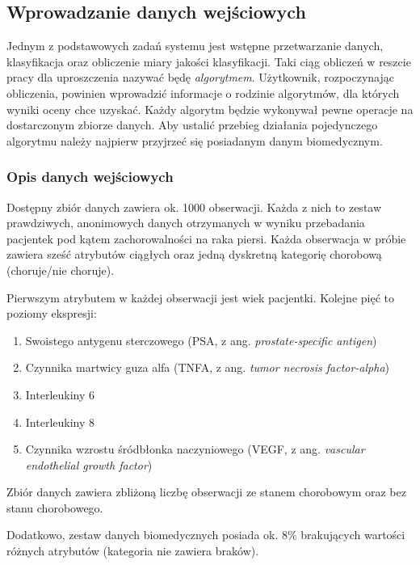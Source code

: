 \documentclass[../thesis.tex]{subfiles}
\begin{document}
\subsection{Wprowadzanie danych wejściowych}
\label{req:input}

Jednym z podstawowych zadań systemu jest wstępne przetwarzanie danych, klasyfikacja oraz obliczenie miary jakości klasyfikacji. Taki ciąg obliczeń w reszcie pracy dla uproszczenia nazywać będę \emph{algorytmem}. Użytkownik, rozpoczynając obliczenia, powinien wprowadzić informacje o rodzinie algorytmów, dla których wyniki oceny chce uzyskać. Każdy algorytm będzie wykonywał pewne operacje na dostarczonym zbiorze danych. Aby ustalić przebieg działania pojedynczego algorytmu należy najpierw przyjrzeć się posiadanym danym biomedycznym.

\subsubsection{Opis danych wejściowych}

Dostępny zbiór danych zawiera ok. 1000 obserwacji. Każda z nich to zestaw prawdziwych, anonimowych danych otrzymanych w wyniku przebadania pacjentek pod kątem zachorowalności na raka piersi. Każda obserwacja w próbie zawiera sześć atrybutów ciągłych oraz jedną dyskretną kategorię chorobową (choruje/nie choruje). 

Pierwszym atrybutem w każdej obserwacji jest wiek pacjentki. Kolejne pięć to poziomy ekspresji:
\begin{enumerate}
  \item Swoistego antygenu sterczowego (PSA, z ang. \emph{prostate-specific antigen})
  \item Czynnika martwicy guza alfa (TNFA, z ang. \emph{tumor necrosis factor-alpha})
  \item Interleukiny 6
  \item Interleukiny 8
  \item Czynnika wzrostu śródbłonka naczyniowego (VEGF, z ang. \emph{vascular endothelial growth factor})
\end{enumerate}
Zbiór danych zawiera zbliżoną liczbę obserwacji ze stanem chorobowym oraz bez stanu chorobowego.

Dodatkowo, zestaw danych biomedycznych posiada ok. 8\% brakujących wartości różnych atrybutów (kategoria nie zawiera braków).
\end{document}

